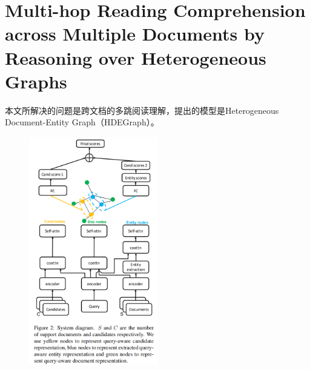 \documentclass[a4paper,UTF8]{article}
\numberwithin{equation}{section}
\begin{document}
\newpage
\section{Multi-hop Reading Comprehension across Multiple Documents by Reasoning over Heterogeneous Graphs}
本文所解决的问题是跨文档的多跳阅读理解，提出的模型是Heterogeneous Document-Entity Graph（HDEGraph）。


\begin{figure}[H]
	\centering
	\includegraphics[width=0.5\textwidth]{6-1.png}
\end{figure}
\end{document}
